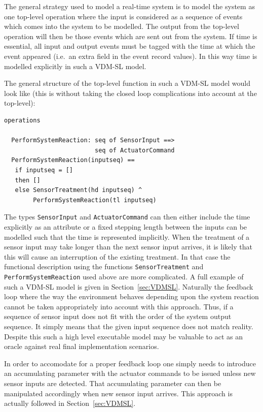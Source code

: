 \documentclass{overturerepchap}
\begin{document}
The general strategy used to model a real-time system is to model the
system as one top-level operation where the input is considered as a
sequence of events which comes into the system to be modelled. The
output from the top-level operation will then be those events which
are sent out from the system. If time is essential, all input and
output events must be tagged with the time at which the event appeared
(i.e.\ an extra field in the event record values). In this way time is
modelled explicitly in such a VDM-SL model.

The general structure of the top-level function in such a VDM-SL model
would look like (this is without taking the closed loop complications
into account at the top-level):

\begin{lstlisting}
operations

  PerformSystemReaction: seq of SensorInput ==> 
                         seq of ActuatorCommand
  PerformSystemReaction(inputseq) ==
   if inputseq = []
   then []
   else SensorTreatment(hd inputseq) ^ 
        PerformSystemReaction(tl inputseq)
\end{lstlisting}

The types \texttt{SensorInput} and \texttt{ActuatorCommand} can then
either include the time explicitly as an attribute or a fixed
stepping length between the inputs can be modelled such that the time
is represented implicitly. When the treatment of a sensor input may
take longer than the next sensor input arrives, it is likely that this
will cause an interruption of the existing treatment. In that case the
functional description using the functions \texttt{SensorTreatment} and
\texttt{PerformSystemReaction} used above are more complicated. A full example
of such a VDM-SL model is given in Section~\ref{sec:VDMSL}. Naturally
the feedback loop where the way the environment behaves depending upon
the system reaction cannot be taken appropriately into account with
this approach. Thus, if a sequence of sensor input does not fit with
the order of the system output sequence. It simply means that the
given input sequence does not match reality. Despite this such a high
level executable model may be valuable to act as an oracle against
real final implementation scenarios.

In order to accomodate for a proper feedback loop one simply needs to
introduce an accumulating parameter with the actuator commands to be 
issued unless new sensor inputs are detected. That accumulating
parameter can then be manipulated accordingly when new sensor
input arrives. This approach is actually followed in 
Section~\ref{sec:VDMSL}.
\end{document}
